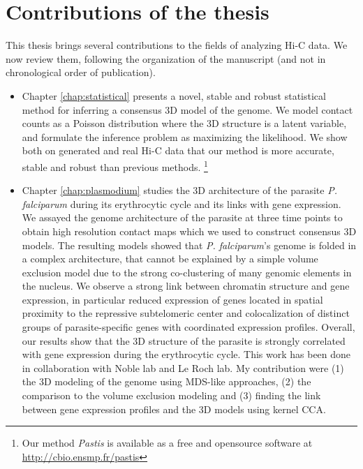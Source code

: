 \section{Contributions of the thesis}

This thesis brings several contributions to the fields of analyzing Hi-C data.
We now review them, following the organization of the manuscript (and not in
chronological order of publication).

\begin{itemize}

\item Chapter \ref{chap:statistical} presents a novel, stable and robust
statistical method for inferring a consensus 3D model of the genome. We model
contact counts as a Poisson distribution where the 3D structure is a latent
variable, and formulate the inference problem as maximizing the likelihood. We
show both on generated and real Hi-C data that our method is more accurate,
stable and robust than previous methods. \footnote{Our method \textit{Pastis}
is available as a free and opensource software at
\url{http://cbio.ensmp.fr/pastis}}

\item Chapter \ref{chap:plasmodium} studies the 3D architecture of the
parasite {\em P. falciparum} during its erythrocytic cycle and its links with
gene expression. We assayed the genome architecture of the parasite at three
time points to obtain high resolution contact maps which we used to construct
consensus 3D models. The resulting models showed that {\em P. falciparum}'s
genome is folded in a complex architecture, that cannot be explained by a
simple volume exclusion model due to the strong co-clustering of many genomic
elements in the nucleus. We observe a strong link between chromatin structure
and gene expression, in particular reduced expression of genes located in
spatial proximity to the repressive subtelomeric center and colocalization of
distinct groups of parasite-specific genes with coordinated expression
profiles. Overall, our results show that the 3D structure of the parasite is
strongly correlated with gene expression during the erythrocytic cycle. This
work has been done in collaboration with Noble lab and Le Roch lab. My
contribution were (1) the 3D modeling of the genome using MDS-like approaches,
(2) the comparison to the volume exclusion modeling and (3) finding the link
between gene expression profiles and the 3D models using kernel CCA.


\end{itemize}
